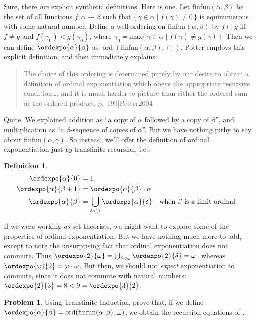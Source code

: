 \documentclass[10pt,a4paper]{article}
\makeatletter
\theoremstyle{plain}
\theoremstyle{definition}
\newtheorem{defn}[thm]{Definition}
\newtheorem{prob}{Problem}[section]
\theoremstyle{remark}
\newcommand*{\ollabel}[1]{\label{#1}}
\newcommand{\olref}{\@ifnextchar[{\olref@i}{\olref@final}}
\def\olref@i[#1]{\@ifnextchar[{\olref@ii}{\olref@final}}
\def\olref@ii[#1]{\@ifnextchar[{\olref@iii}{\olref@final}}
\def\olref@iii[#1]{\olref@final}
\def\olref@final#1{\ref{#1}}
\providecommand{\ordtimes}{\mathbin{\cdot}}
\providecommand{\ordtype}[1]{\operatorname{ord}(#1)}
\providecommand{\Setabs}[2]{\{\, #1 \mid #2 \,\}}
\providecommand{\citep}[1]{\cite{#1}}
\providecommand{\ordplus}{\mathbin{+}}
\makeatother
\begin{document}
Sure, there \emph{are} explicit synthetic definitions. Here is one.
Let $\text{finfun}(\alpha,\beta)$ be the set of all functions $f
\colon \alpha \to \beta$ such that $\Setabs{\gamma \in
\alpha}{f(\gamma) \neq 0}$ is equinumerous with some natural number.
Define a well-ordering on $\text{finfun}(\alpha,\beta)$ by $f
\sqsubset g$ iff $f \neq g$ and $f(\gamma_0) < g(\gamma_0)$, where
$\gamma_0 = \text{max}\Setabs{\gamma \in \alpha}{f(\gamma) \neq
g(\gamma)}$. Then we can define $\ordexpo{\alpha}{\beta}$ as
$\ordtype{\text{finfun}(\alpha, \beta), \sqsubset}$. Potter employs
this explicit definition, and then immediately explains:
\begin{quote}
	The choice of this ordering is determined purely by our desire to
	obtain a definition of ordinal exponentiation which obeys the
	appropriate recursive condition\ldots, and it is much harder to
	picture than either the ordered sum or the ordered product.
	\citep[p.~199]{Potter2004}
\end{quote}
Quite. We explained addition as ``a copy of $\alpha$ followed by a
copy of $\beta$'', and multiplication as ``a $\beta$-sequence of
copies of $\alpha$''. But we have nothing pithy to say about
$\text{finfun}(\alpha, \gamma)$. So instead, we'll offer the
definition of ordinal exponentiation just \emph{by} transfinite
recursion, i.e.:

\begin{defn}\ollabel{ordexporecursion}
\begin{align*}
	\ordexpo{\alpha}{0} &= 1\\
	\ordexpo{\alpha}{\beta\ordplus 1} &=\ordexpo{\alpha}{\beta} \ordtimes \alpha\\
	\ordexpo{\alpha}{\beta} &= \bigcup_{\delta < \beta}\ordexpo{\alpha}{\delta}& & \text{when $\beta$ is a limit ordinal}
\end{align*}
\end{defn}

If we were working \emph{as} set theorists, we might want to explore
some of the properties of ordinal exponentiation. But we have nothing
much more to add, except to note the unsurprising fact that ordinal
exponentiation does not commute. Thus $\ordexpo{2}{\omega} =
\bigcup_{\delta < \omega}\ordexpo{2}{\delta} = \omega$, whereas
$\ordexpo{\omega}{2} = \omega \ordtimes \omega$. But then, we should
not \emph{expect} exponentiation to commute, since it does not commute
with natural numbers: $\ordexpo{2}{3} = 8 < 9 = \ordexpo{3}{2}$. 

\begin{prob}
Using Transfinite Induction, prove that, if we define
$\ordexpo{\alpha}{\beta} = \ordtype{\text{finfun}(\alpha, \beta),
\sqsubset}$, we obtain the recursion equations of
\olref[sth][ord-arithmetic][expo]{ordexporecursion}.
\end{prob}
\end{document}
